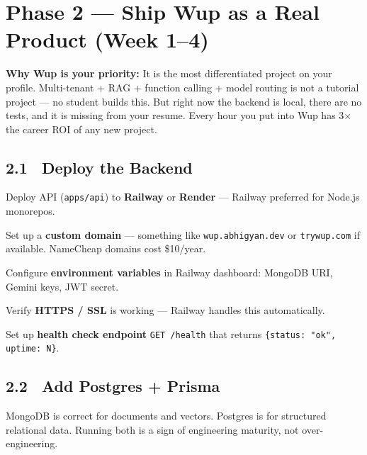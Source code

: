 \documentclass[11pt, a4paper]{article}
\DeclareRobustCommand{\badge}[2]{%
  \tikz[baseline=(n.base)]{
    \node[inner sep=3pt, rounded corners=3pt,
          fill=#1!15, text=#1!70!black,
          font=\fontsize{8}{8}\selectfont\bfseries] (n) {#2};
  }%
}
\DeclareRobustCommand{\critical}{\badge{danger}{CRITICAL}}
\begin{document}
\section{Phase 2 — Ship Wup as a Real Product (Week 1–4)}
\label{sec:wup}

\begin{infobox}
\textbf{Why Wup is your priority:} It is the most differentiated project on your profile. Multi-tenant + RAG + function calling + model routing is not a tutorial project — no student builds this. But right now the backend is local, there are no tests, and it is missing from your resume. Every hour you put into Wup has 3$\times$ the career ROI of any new project.
\end{infobox}

\subsection{2.1 \ Deploy the Backend \hfill \critical}

\begin{checklist}
  \item Deploy API (\texttt{apps/api}) to \textbf{Railway} or \textbf{Render} — Railway preferred for Node.js monorepos.
  \item Set up a \textbf{custom domain} — something like \texttt{wup.abhigyan.dev} or \texttt{trywup.com} if available. NameCheap domains cost \$10/year.
  \item Configure \textbf{environment variables} in Railway dashboard: MongoDB URI, Gemini keys, JWT secret.
  \item Verify \textbf{HTTPS / SSL} is working — Railway handles this automatically.
  \item Set up \textbf{health check endpoint} \texttt{GET /health} that returns \texttt{\{status: "ok", uptime: N\}}.
\end{checklist}

\subsection{2.2 \ Add Postgres + Prisma \hfill \critical}

MongoDB is correct for documents and vectors. Postgres is for structured relational data. Running both is a sign of engineering maturity, not over-engineering.
\end{document}

